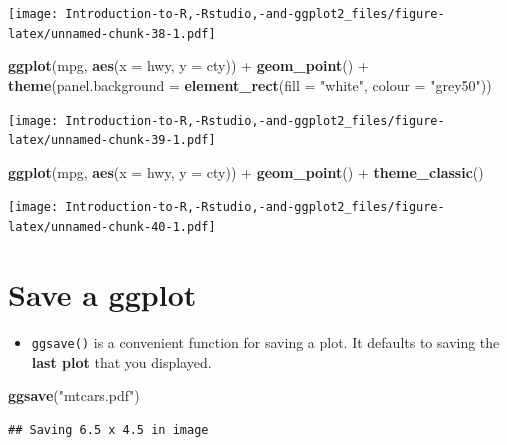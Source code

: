\documentclass[]{book}
\newenvironment{Shaded}{\begin{snugshade}}{\end{snugshade}}
\newcommand{\KeywordTok}[1]{\textcolor[rgb]{0.13,0.29,0.53}{\textbf{{#1}}}}
\newcommand{\DataTypeTok}[1]{\textcolor[rgb]{0.13,0.29,0.53}{{#1}}}
\newcommand{\StringTok}[1]{\textcolor[rgb]{0.31,0.60,0.02}{{#1}}}
\newcommand{\NormalTok}[1]{{#1}}
\providecommand{\tightlist}{%
  \setlength{\itemsep}{0pt}\setlength{\parskip}{0pt}}
\begin{document}
\texttt{[image: Introduction-to-R,-Rstudio,-and-ggplot2\_files/figure-latex/unnamed-chunk-38-1.pdf]}

\begin{Shaded}
\begin{Highlighting}[]
\KeywordTok{ggplot}\NormalTok{(mpg, }\KeywordTok{aes}\NormalTok{(}\DataTypeTok{x =} \NormalTok{hwy, }\DataTypeTok{y =} \NormalTok{cty)) +}\StringTok{ }\KeywordTok{geom_point}\NormalTok{() +}\StringTok{ }\KeywordTok{theme}\NormalTok{(}\DataTypeTok{panel.background =} \KeywordTok{element_rect}\NormalTok{(}\DataTypeTok{fill =} \StringTok{"white"}\NormalTok{, }\DataTypeTok{colour =} \StringTok{"grey50"}\NormalTok{))}
\end{Highlighting}
\end{Shaded}

\texttt{[image: Introduction-to-R,-Rstudio,-and-ggplot2\_files/figure-latex/unnamed-chunk-39-1.pdf]}

\begin{Shaded}
\begin{Highlighting}[]
\KeywordTok{ggplot}\NormalTok{(mpg, }\KeywordTok{aes}\NormalTok{(}\DataTypeTok{x =} \NormalTok{hwy, }\DataTypeTok{y =} \NormalTok{cty)) +}\StringTok{ }\KeywordTok{geom_point}\NormalTok{() +}\StringTok{ }\KeywordTok{theme_classic}\NormalTok{()}
\end{Highlighting}
\end{Shaded}

\texttt{[image: Introduction-to-R,-Rstudio,-and-ggplot2\_files/figure-latex/unnamed-chunk-40-1.pdf]}

\section{Save a ggplot}\label{save-a-ggplot}

\begin{itemize}
\tightlist
\item
  \texttt{ggsave()} is a convenient function for saving a plot. It
  defaults to saving the \textbf{last plot} that you displayed.
\end{itemize}

\begin{Shaded}
\begin{Highlighting}[]
\KeywordTok{ggsave}\NormalTok{(}\StringTok{"mtcars.pdf"}\NormalTok{)}
\end{Highlighting}
\end{Shaded}

\begin{verbatim}
## Saving 6.5 x 4.5 in image
\end{verbatim}
\end{document}
